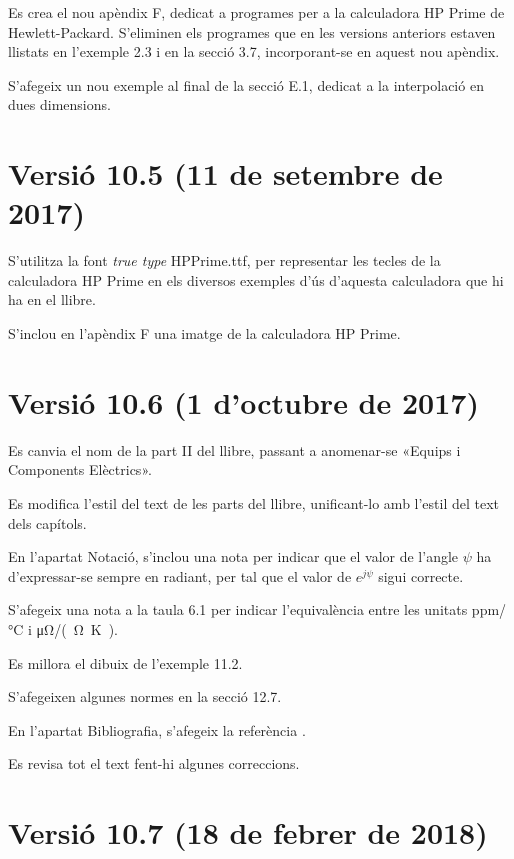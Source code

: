 Es crea el nou apèndix F, dedicat a programes per a la calculadora \textsf{HP Prime} de Hewlett-Packard. S'eliminen els programes que en les versions anteriors estaven llistats en l'exemple 2.3 i en la secció 3.7, incorporant-se en aquest nou apèndix.

S'afegeix un nou exemple al final de la secció E.1, dedicat  a la interpolació en dues dimensions.

\section*{Versió 10.5 (11 de setembre de 2017)}

S'utilitza la font \textit{true type} \textsf{HPPrime.ttf}, per representar les tecles de la calculadora \textsf{HP Prime} en els diversos exemples d'ús d'aquesta calculadora que hi ha en el llibre.

S'inclou en l'apèndix F una imatge de la calculadora \textsf{HP Prime}.


\section*{Versió 10.6 (1 d'octubre de 2017)}

Es canvia el nom de la part II del llibre, passant a anomenar-se «Equips i Components Elèctrics».

Es modifica l'estil del text de les parts del llibre, unificant-lo amb l'estil del text dels capítols.

En l'apartat Notació, s'inclou una nota per indicar  que el valor de l'angle $\psi$ ha d'expressar-se sempre en radiant, per tal que el valor de $e^{j\psi}$ sigui correcte.

S'afegeix una nota a la taula 6.1 per indicar l'equivalència entre les unitats \unit{ppm/\degreeCelsius}  i \unit{\micro\ohm/(\ohm.\kelvin)}.

Es millora el dibuix de l'exemple 11.2.

S’afegeixen algunes normes en la secció 12.7.

En l'apartat Bibliografia, s'afegeix la referència \cite{BUR}.

Es revisa tot el text fent-hi algunes correccions.


\section*{Versió 10.7 (18 de febrer de 2018)}

